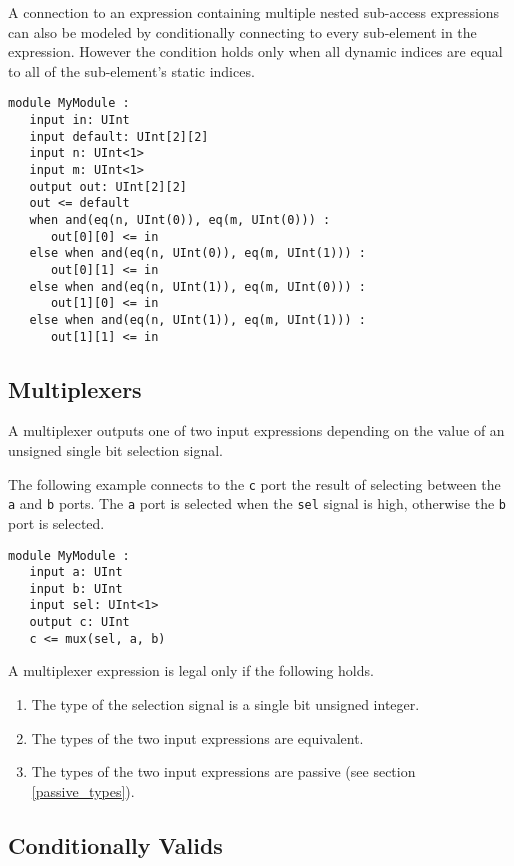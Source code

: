 \documentclass[12pt]{article}
\begin{document}
A connection to an expression containing multiple nested sub-access expressions can also be modeled by conditionally connecting to every sub-element in the expression. However the condition holds only when all dynamic indices are equal to all of the sub-element's static indices.
\begin{lstlisting}
module MyModule :
   input in: UInt
   input default: UInt[2][2]
   input n: UInt<1>
   input m: UInt<1>
   output out: UInt[2][2]
   out <= default
   when and(eq(n, UInt(0)), eq(m, UInt(0))) :
      out[0][0] <= in
   else when and(eq(n, UInt(0)), eq(m, UInt(1))) :
      out[0][1] <= in
   else when and(eq(n, UInt(1)), eq(m, UInt(0))) :
      out[1][0] <= in
   else when and(eq(n, UInt(1)), eq(m, UInt(1))) :
      out[1][1] <= in
\end{lstlisting}

\subsection{Multiplexers}\label{multiplexers}

A multiplexer outputs one of two input expressions depending on the value of an unsigned single bit selection signal.

The following example connects to the \verb|c| port the result of selecting between the \verb|a| and \verb|b| ports. The \verb|a| port is selected when the \verb|sel| signal is high, otherwise the \verb|b| port is selected.
\begin{lstlisting}
module MyModule :
   input a: UInt
   input b: UInt
   input sel: UInt<1>
   output c: UInt
   c <= mux(sel, a, b)
\end{lstlisting}

A multiplexer expression is legal only if the following holds.
\begin{enumerate}
\item The type of the selection signal is a single bit unsigned integer.
\item The types of the two input expressions are equivalent.
\item The types of the two input expressions are passive (see section \ref{passive_types}).
\end{enumerate}

\subsection{Conditionally Valids} \label{conditionally_valids}
\end{document}
